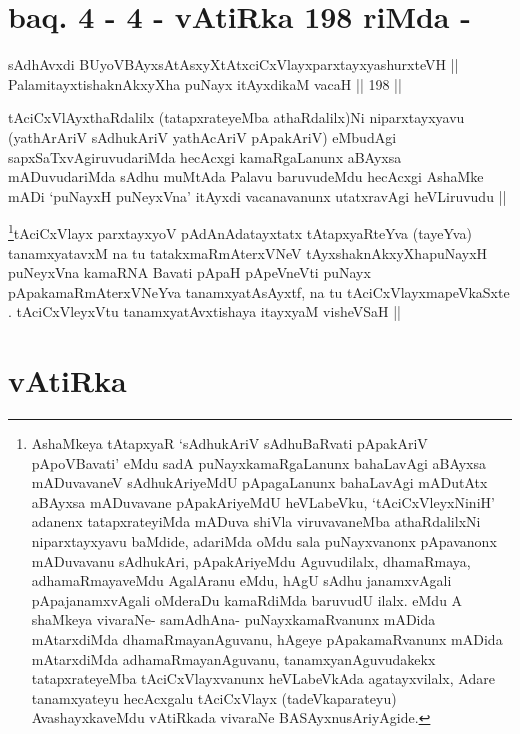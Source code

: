 \section*{baq. 4 - 4 - vAtiRka 198 riMda -}


\begin{shl}
sAdhAvxdi BUyoVBAyxsAtAsxyXtAtxciCxVlayxparxtayxyashurxteVH || \\
PalamitayxtishaknAkxyX\s \s ha puNayx itAyxdikaM vacaH ||  198 ||  
\end{shl}

\begin{artha}
tAciCxVlAyxthaRdalilx (tatapxrateyeMba athaRdalilx)Ni niparxtayxyavu
(yathArAriV sAdhukAriV yathAcAriV pApakAriV) eMbudAgi
sapxSaTxvAgiruvudariMda hecAcxgi kamaRgaLanunx aBAyxsa mADuvudariMda
sAdhu muMtAda Palavu baruvudeMdu hecAcxgi AshaMke mADi `puNayxH
puNeyxVna' itAyxdi vacanavanunx utatxravAgi heVLiruvudu ||
\end{artha}


\footnote{AshaMkeya tAtapxyaR `sAdhukAriV sAdhuBaRvati pApakAriV
pApoVBavati' eMdu sadA puNayxkamaRgaLanunx bahaLavAgi aBAyxsa
mADuvavaneV sAdhukAriyeMdU pApagaLanunx bahaLavAgi mADutAtx aBAyxsa
mADuvavane pApakAriyeMdU heVLabeVku, `tAciCxVleyxNiniH' adanenx
tatapxrateyiMda mADuva shiVla viruvavaneMba athaRdalilxNi
niparxtayxyavu baMdide, adariMda oMdu sala puNayxvanonx pApavanonx
mADuvavanu sAdhukAri, pApakAriyeMdu Aguvudilalx, dhamaRmaya,
adhamaRmayaveMdu AgalAranu eMdu, hAgU sAdhu janamxvAgali
pApajanamxvAgali oMderaDu kamaRdiMda baruvudU ilalx. eMdu A shaMkeya
vivaraNe- samAdhAna- puNayxkamaRvanunx mADida mAtarxdiMda
dhamaRmayanAguvanu, hAgeye pApakamaRvanunx mADida mAtarxdiMda
adhamaRmayanAguvanu, tanamxyanAguvudakekx tatapxrateyeMba
tAciCxVlayxvanunx heVLabeVkAda agatayxvilalx, Adare tanamxyateyu
hecAcxgalu tAciCxVlayx (tadeVkaparateyu) AvashayxkaveMdu vAtiRkada
vivaraNe BASAyxnusAriyAgide.}tAciCxVlayx parxtayxyoV pAdAnAdatayxtatx tAtapxyaRteYva (tayeYva) tanamxyatavxM na tu tatakxmaRmAterxVNeV tAyxshaknAkxyX\s \s hapuNayxH puNeyxVna kamaRNA Bavati pApaH pApeVneVti puNayx pApakamaRmAterxVNeYva tanamxyatAsAyxtf, na tu tAciCxVlayxmapeVkaSxte . tAciCxVleyxVtu tanamxyatAvxtishaya itayxyaM visheVSaH ||

\section*{vAtiRka}

